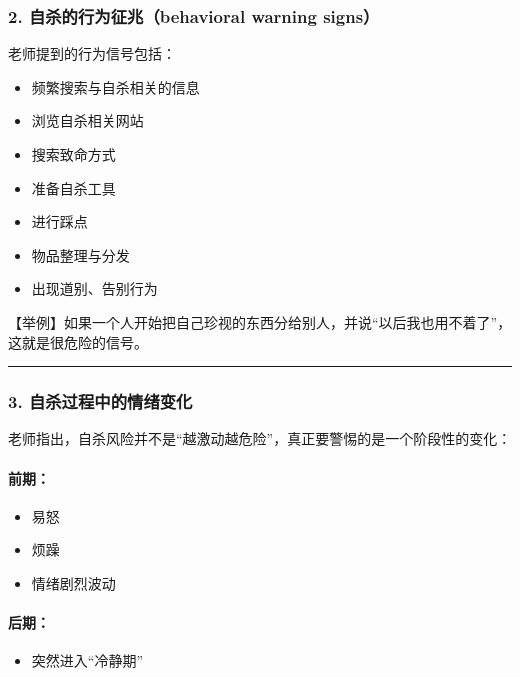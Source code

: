 \documentclass[
  chinese,
  9pt,
  a4paper,
]{ctexart}
\providecommand{\tightlist}{%
  \setlength{\itemsep}{0pt}\setlength{\parskip}{0pt}}
\begin{document}
\subsubsection{2. 自杀的行为征兆（behavioral warning
signs）}\label{ux81eaux6740ux7684ux884cux4e3aux5f81ux5146behavioral-warning-signs}

老师提到的行为信号包括：

\begin{itemize}
\tightlist
\item
  频繁搜索与自杀相关的信息
\item
  浏览自杀相关网站
\item
  搜索致命方式
\item
  准备自杀工具
\item
  进行踩点
\item
  物品整理与分发
\item
  出现道别、告别行为
\end{itemize}

【举例】如果一个人开始把自己珍视的东西分给别人，并说``以后我也用不着了''，这就是很危险的信号。

\begin{center}\rule{0.5\linewidth}{0.5pt}\end{center}

\subsubsection{3.
自杀过程中的情绪变化}\label{ux81eaux6740ux8fc7ux7a0bux4e2dux7684ux60c5ux7eeaux53d8ux5316}

老师指出，自杀风险并不是``越激动越危险''，真正要警惕的是一个阶段性的变化：

\paragraph{前期：}\label{ux524dux671f}

\begin{itemize}
\tightlist
\item
  易怒
\item
  烦躁
\item
  情绪剧烈波动
\end{itemize}

\paragraph{后期：}\label{ux540eux671f}

\begin{itemize}
\tightlist
\item
  突然进入``冷静期''
\end{itemize}
\end{document}
